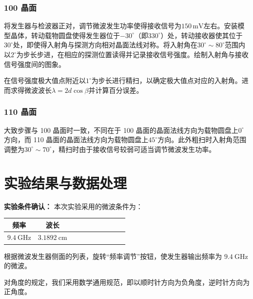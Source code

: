 \documentclass[UTF8]{article}
\theoremstyle{MyLineTheoremStyle} %
\theoremstyle{MyBlockTheoremStyle} %
\theoremstyle{MySubsubsectionStyle} %
\begin{document}
\subsubsection{ 100 晶面}
将发生器与检波器正对，调节微波发生功率使得接收信号为$ 150\,\mathrm{mV} $左右。安装模型晶体，转动载物圆盘使得发生器位于$ -30^\circ $（即$ 330^\circ $）处，转动接收器使其位于$ 30^\circ $处，即使得入射角与探测方向相对晶面法线对称。将入射角在$ 30^\circ\sim80^\circ $范围内以$ 2^\circ $为步长步进，在相应的探测位置读得并记录接收信号强度。绘制入射角与接收信号强度间的图象。

在信号强度极大值点附近以$ 1^\circ $为步长进行精扫，以确定极大值点对应的入射角。进而求得微波波长$ \lambda=2d\cos\beta $并计算百分误差。

\subsubsection{ 110 晶面}
大致步骤与 100 晶面时一致，不同在于 100 晶面的晶面法线方向为载物圆盘上$ 0^\circ $方向，而 110 晶面的晶面法线方向为载物圆盘上$ 45^\circ $方向。此外粗扫时入射角范围调整为$ 30^\circ\sim70^\circ $，精扫时由于接收信号较弱可适当调节微波发生功率。

\section{实验结果与数据处理}

\noindent\textbf{实验条件确认：}
本次实验采用的微波条件为：
\begin{table}[H]\centering
    \begin{tabular}{cccccccccc}\toprule
        频率 & 波长  \\
        \midrule
        $9.4 \ \mathrm{GHz}$ & $3.1892 \ \mathrm{cm}$ \\
        \bottomrule
    \end{tabular}
\end{table}
根据微波发生器侧面的列表，旋转“频率调节”按钮，使发生器输出频率为 $9.4 \ \mathrm{GHz}$ 的微波。

对角度的规定，我们采用数学通用规范，即以顺时针方向为负角度，逆时针方向为正角度。
\end{document}
